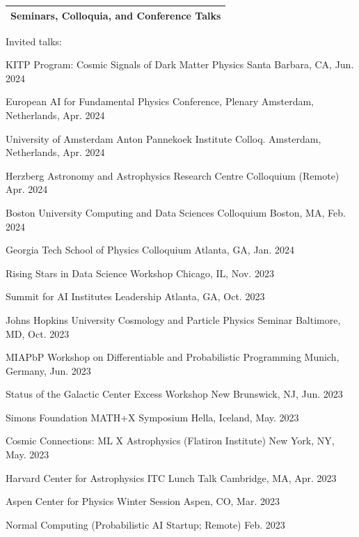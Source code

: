 \documentclass[letterpaper,11pt]{article}
\newenvironment{packed_itemize}{
\begin{itemize}[label=\raisebox{0.25ex}{\tiny$\bullet$}]
  \setlength{\itemsep}{4.2pt}
  \setlength{\parskip}{0pt}
  \setlength{\parsep}{0pt}}{\end{itemize}
}
\begin{document}


\noindent
\begin{tabular*}{\textwidth}{l@{\extracolsep{\fill}}}
\large {\sc \Large{Seminars, Colloquia, and Conference Talks}}\\
\hline
\end{tabular*}\vspace{3.5mm}

\noindent
Invited talks:
\begin{packed_itemize}
  \item KITP Program: Cosmic Signals of Dark Matter Physics \hfill Santa Barbara, CA, Jun. 2024
  \item European AI for Fundamental Physics Conference, Plenary \hfill Amsterdam, Netherlands, Apr. 2024
  \item University of Amsterdam Anton Pannekoek Institute Colloq. \hfill Amsterdam, Netherlands, Apr. 2024
  \item Herzberg Astronomy and Astrophysics Research Centre Colloquium (Remote) \hfill Apr. 2024
  \item Boston University Computing and Data Sciences Colloquium \hfill Boston, MA, Feb. 2024
  \item Georgia Tech School of Physics Colloquium \hfill Atlanta, GA, Jan. 2024
  \item Rising Stars in Data Science Workshop \hfill Chicago, IL, Nov. 2023
  \item Summit for AI Institutes Leadership \hfill Atlanta, GA, Oct. 2023
  \item Johns Hopkins University Cosmology and Particle Physics Seminar \hfill Baltimore, MD, Oct. 2023
  \item MIAPbP Workshop on Differentiable and Probabilistic Programming \hfill Munich, Germany, Jun. 2023
  \item Status of the Galactic Center Excess Workshop \hfill New Brunswick, NJ, Jun. 2023
  \item Simons Foundation MATH+X Symposium \hfill Hella, Iceland, May. 2023
  \item Cosmic Connections: ML X Astrophysics (Flatiron Institute) \hfill New York, NY, May. 2023
  \item Harvard Center for Astrophysics ITC Lunch Talk  \hfill Cambridge, MA, Apr. 2023
  \item Aspen Center for Physics Winter Session \hfill Aspen, CO, Mar. 2023
  \item Normal Computing (Probabilistic AI Startup; Remote) \hfill Feb. 2023

\end{packed_itemize}
\end{document}
